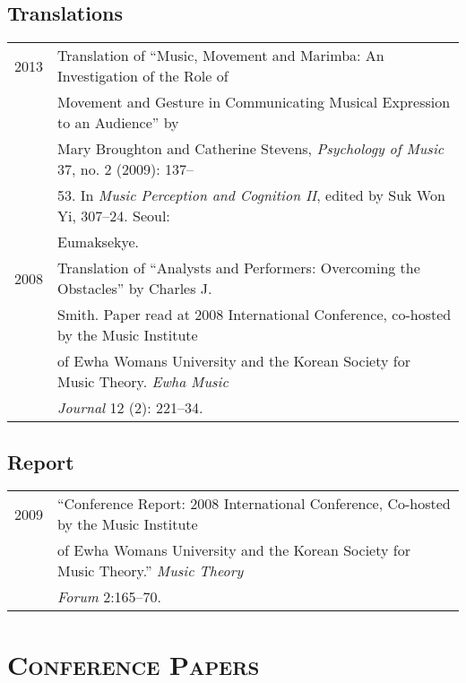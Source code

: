 \documentclass[a4paper,11pt]{article}
\begin{document}
  \subsection*{Translations}
  \hspace*{-0.25cm}
  \begin{tabular}{p{2.5cm} p{12.5cm}}
    2013 & Translation of “Music, Movement and Marimba: An Investigation of the Role of\\
    & Movement and Gesture in Communicating Musical Expression to an Audience” by\\
    & Mary Broughton and Catherine Stevens, \textit{Psychology of Music} 37, no. 2 (2009): 137–\\
    & 53. In \textit{Music Perception and Cognition II}, edited by Suk Won Yi, 307–24. Seoul:\\
    & Eumaksekye.\\[2mm]
    
    2008 & Translation of “Analysts and Performers: Overcoming the Obstacles” by Charles J.\\
    & Smith. Paper read at 2008 International Conference, co-hosted by the Music Institute\\
    & of Ewha Womans University and the Korean Society for Music Theory. \textit{Ewha Music}\\
    & \textit{Journal} 12 (2): 221–34.
  \end{tabular}
  
  \subsection*{Report}
  \hspace*{-0.25cm}
  \begin{tabular}{p{2.5cm} p{12.5cm}}
    2009 & “Conference Report: 2008 International Conference, Co-hosted by the Music Institute\\
    & of Ewha Womans University and the Korean Society for Music Theory.” \textit{Music Theory}\\
    & \textit{Forum} 2:165–70.   
  \end{tabular}
  
  \vspace{5.0mm}
  
  \section*{\textsc{Conference Papers}}
  
\end{document}
